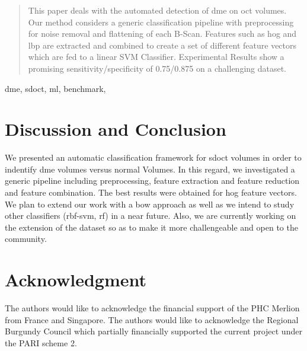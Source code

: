 \documentclass[10pt,conference]{latex/ieeeconf}
\begin{document}

\maketitle

\begin{abstract}
This paper deals with the automated detection of \gls{dme} on \gls{oct} volumes.
Our method considers a generic classification pipeline with preprocessing for noise removal and flattening of each B-Scan.
Features such as \gls{hog} and \gls{lbp} are extracted and combined to create a set of different feature vectors which are fed to a linear SVM Classifier.
Experimental Results show a promising sensitivity/specificity of 0.75/0.875 on a challenging dataset.
\end{abstract}

\begin{keywords}
  \glsresetall %
  \gls{dme},
  \gls{sdoct},
  \gls{ml},
  benchmark,
\end{keywords}


\glsresetall %





\section{Discussion and Conclusion}\label{sec:dis-con}

We presented an automatic classification framework for \gls{sdoct} volumes in order to indentify \gls{dme} volumes versus normal Volumes.
In this regard, we investigated a generic pipeline including preprocessing, feature extraction and feature reduction and feature combination.
The best results were obtained for \gls{hog} feature vectors.
We plan to extend our work with a \gls{bow} approach as well as we intend to study other classifiers (\gls{rbf}-\gls{svm}, \gls{rf}) in a near future.
Also, we are currently working on the extension of the dataset so as to make it more challengeable and open to the community.

\section{Acknowledgment}
The authors would like to acknowledge the financial support of the PHC Merlion from France and Singapore.
The authors would like to acknowledge the Regional Burgundy Council which partially financially supported the current project under the PARI scheme 2.
\end{document}
